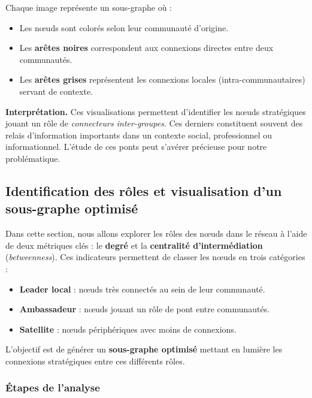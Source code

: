\documentclass[a4paper, 12pt, twoside]{article}
\begin{document}
\vspace{1em}
Chaque image représente un sous-graphe où :
\begin{itemize}
    \item Les nœuds sont colorés selon leur communauté d’origine.
    \item Les \textbf{arêtes noires} correspondent aux connexions directes entre deux communautés.
    \item Les \textbf{arêtes grises} représentent les connexions locales (intra-communautaires) servant de contexte.
\end{itemize}

\vspace{1em}
\noindent
\textbf{Interprétation.} Ces visualisations permettent d’identifier les nœuds stratégiques jouant un rôle de \textit{connecteurs inter-groupes}. Ces derniers constituent souvent des relais d’information importants dans un contexte social, professionnel ou informationnel. L’étude de ces ponts peut s’avérer précieuse pour notre problématique.








\subsection{Identification des rôles et visualisation d'un sous-graphe optimisé}

Dans cette section, nous allons explorer les rôles des nœuds dans le réseau à l'aide de deux métriques clés : le \textbf{degré} et la \textbf{centralité d'intermédiation} (\textit{betweenness}). Ces indicateurs permettent de classer les nœuds en trois catégories :

\begin{itemize}
    \item \textbf{Leader local} : nœuds très connectés au sein de leur communauté.
    \item \textbf{Ambassadeur} : nœuds jouant un rôle de pont entre communautés.
    \item \textbf{Satellite} : nœuds périphériques avec moins de connexions.
\end{itemize}

L’objectif est de générer un \textbf{sous-graphe optimisé} mettant en lumière les connexions stratégiques entre ces différents rôles.

\subsubsection*{Étapes de l’analyse}
\end{document}
